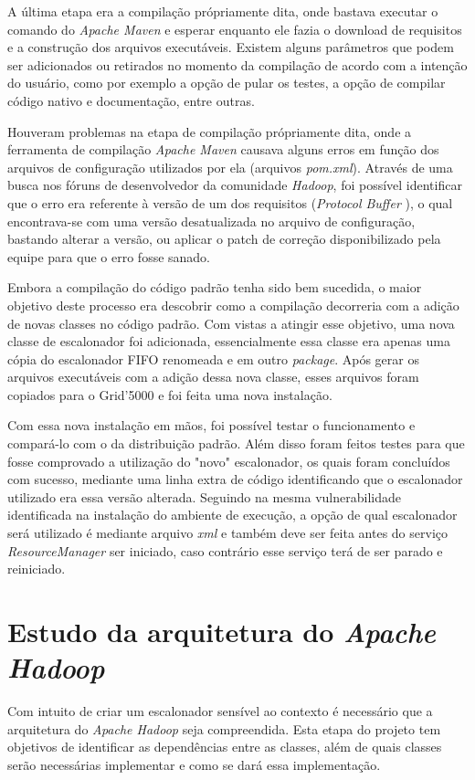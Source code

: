 A última etapa era a compilação própriamente dita, onde bastava executar o comando do \emph{Apache Maven} \cite{Maven} e esperar enquanto ele fazia o download de requisitos e a construção dos arquivos executáveis. Existem alguns parâmetros que podem ser adicionados ou retirados no momento da compilação de acordo com a intenção do usuário, como por exemplo a opção de pular os testes, a opção de compilar código nativo e documentação, entre outras.

Houveram problemas na etapa de compilação própriamente dita, onde a ferramenta de compilação \emph{Apache Maven} causava alguns erros em função dos arquivos de configuração utilizados por ela (arquivos \emph{pom.xml}). Através de uma busca nos fóruns de desenvolvedor da comunidade \emph{Hadoop}, foi possível identificar que o erro era referente à versão de um dos requisitos (\emph{Protocol Buffer} \cite{protobuff}), o qual encontrava-se com uma versão desatualizada no arquivo de configuração, bastando alterar a versão, ou aplicar o patch de correção disponibilizado pela equipe para que o erro fosse sanado.

Embora a compilação do código padrão tenha sido bem sucedida, o maior objetivo deste processo era descobrir como a compilação decorreria com a adição de novas classes no código padrão. Com vistas a atingir esse objetivo, uma nova classe de escalonador foi adicionada, essencialmente essa classe era apenas uma cópia do escalonador FIFO renomeada e em outro \emph{package}. Após gerar os arquivos executáveis com a adição dessa nova classe, esses arquivos foram copiados para o Grid'5000 e foi feita uma nova instalação.

Com essa nova instalação em mãos, foi possível testar o funcionamento e compará-lo com o da distribuição padrão. Além disso foram feitos testes para que fosse comprovado a utilização do "novo" escalonador, os quais foram concluídos com sucesso, mediante uma linha extra de código identificando que o escalonador utilizado era essa versão alterada. Seguindo na mesma vulnerabilidade identificada na instalação do ambiente de execução, a opção de qual escalonador será utilizado é mediante arquivo \emph{xml} e também deve ser feita antes do serviço \emph{ResourceManager} ser iniciado, caso contrário esse serviço terá de ser parado e reiniciado.

\section{Estudo da arquitetura do \emph{Apache Hadoop}}
Com intuito de criar um escalonador sensível ao contexto é necessário que a arquitetura do \emph{Apache Hadoop} seja compreendida. Esta etapa do projeto tem objetivos de identificar as dependências entre as classes, além de quais classes serão necessárias implementar e como se dará essa implementação.


